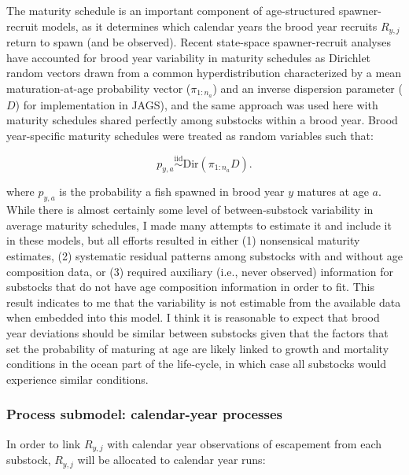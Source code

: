 \documentclass[12pt,]{book}
\theoremstyle{definition}
\theoremstyle{definition}
\theoremstyle{definition}
\theoremstyle{remark}
\begin{document}
The maturity schedule is an important component of age-structured
spawner-recruit models, as it determines which calendar years the brood
year recruits \(R_{y,j}\) return to spawn (and be observed). Recent
state-space spawner-recruit analyses have accounted for brood year
variability in maturity schedules as Dirichlet random vectors drawn from
a common hyperdistribution characterized by a mean maturation-at-age
probability vector (\(\pi_{1:n_a}\)) and an inverse dispersion parameter
(\(D\)) \citep[see][]{fleischman-etal-2013, staton-etal-2017-intseq} for
implementation in JAGS), and the same approach was used here with
maturity schedules shared perfectly among substocks within a brood year.
Brood year-specific maturity schedules were treated as random variables
such that:

\begin{equation}
  p_{y,a} \stackrel{\text{iid}}{\sim} \text{Dir}(\pi_{1:n_a} D). 
  \label{eq:dirichlet}
\end{equation}

\noindent
where \(p_{y,a}\) is the probability a fish spawned in brood year \(y\)
matures at age \(a\). While there is almost certainly some level of
between-substock variability in average maturity schedules, I made many
attempts to estimate it and include it in these models, but all efforts
resulted in either (1) nonsensical maturity estimates, (2) systematic
residual patterns among substocks with and without age composition data,
or (3) required auxiliary (i.e., never observed) information for
substocks that do not have age composition information in order to fit.
This result indicates to me that the variability is not estimable from
the available data when embedded into this model. I think it is
reasonable to expect that brood year deviations should be similar
between substocks given that the factors that set the probability of
maturing at age are likely linked to growth and mortality conditions in
the ocean part of the life-cycle, in which case all substocks would
experience similar conditions.

\subsubsection{Process submodel: calendar-year
processes}\label{ssm-cproc-model}

\noindent
In order to link \(R_{y,j}\) with calendar year observations of
escapement from each substock, \(R_{y,j}\) will be allocated to calendar
year runs:
\end{document}

